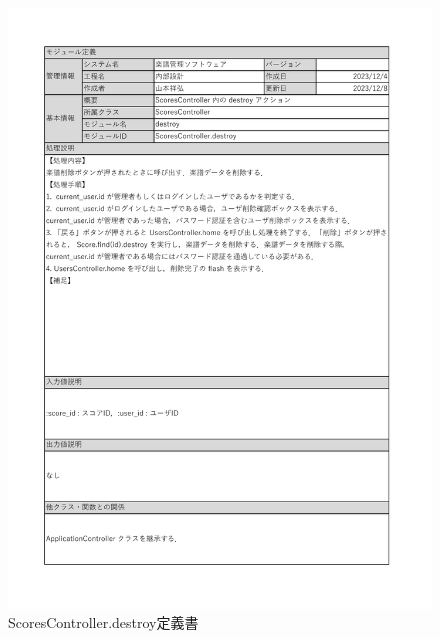 \begin{figure}
    \centering
    \includegraphics[scale=0.7]{img/Scores/xlsx/ScoresController_destroy.pdf}
    \vspace{-1cm}
    \caption{ScoresController.destroy定義書}
\end{figure}
